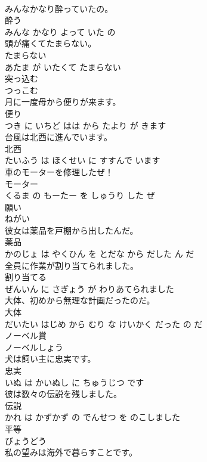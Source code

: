\documentclass[8pt]{extreport}
\begin{document}
\begin{CJK}{UTF8}{min}
\\	みんなかなり酔っていたの。	
\\	酔う 
\\	みんな かなり よって いた の			
\\	頭が痛くてたまらない。	
\\	たまらない 
\\	あたま が いたくて たまらない			
\\	突っ込む	
\\	つっこむ			
\\	月に一度母から便りが来ます。	
\\	便り 
\\	つき に いちど はは から たより が きます			
\\	台風は北西に進んでいます。	
\\	北西 
\\	たいふう は ほくせい に すすんで います			
\\	車のモーターを修理したぜ！	
\\	モーター 
\\	くるま の もーたー を しゅうり した ぜ			
\\	願い	
\\	ねがい			
\\	彼女は薬品を戸棚から出したんだ。	
\\	薬品 
\\	かのじょ は やくひん を とだな から だした ん だ			
\\	全員に作業が割り当てられました。	
\\	割り当てる 
\\	ぜんいん に さぎょう が わりあてられました			
\\	大体、初めから無理な計画だったのだ。	
\\	大体 
\\	だいたい はじめ から むり な けいかく だった の だ			
\\	ノーベル賞	
\\	ノーベルしょう			
\\	犬は飼い主に忠実です。	
\\	忠実 
\\	いぬ は かいぬし に ちゅうじつ です			
\\	彼は数々の伝説を残しました。	
\\	伝説 
\\	かれ は かずかず の でんせつ を のこしました			
\\	平等	
\\	びょうどう			
\\	私の望みは海外で暮らすことです。	

\end{CJK}
\end{document}
